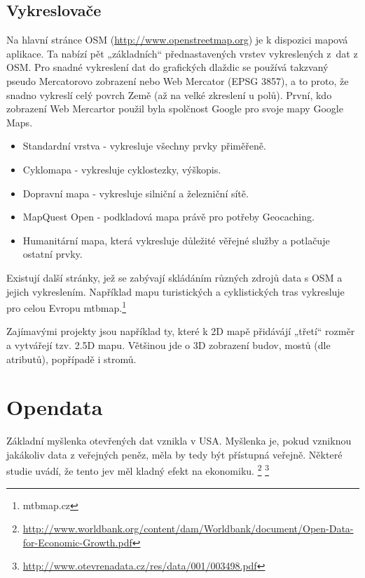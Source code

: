 \subsection{Vykreslovače}
\label{Vykreslovače}
Na hlavní stránce OSM (\url{http://www.openstreetmap.org}) je k dispozici mapová aplikace. Ta nabízí pět
„základních“ přednastavených vrstev vykreslených z~dat z OSM.
Pro snadné vykreslení dat do grafických dlaždic se používá takzvaný pseudo Mercatorovo
zobrazení nebo Web Mercator (EPSG 3857), a to proto, že snadno vykreslí celý povrch Země (až na velké zkreslení u polů). 
První, kdo zobrazení Web Mercartor použil byla spolčnost Google pro svoje mapy Google Maps.\cite{WebMercator}

\begin{itemize}
  \item Standardní vrstva - vykresluje všechny prvky přiměřeně.
  \item Cyklomapa - vykresluje cyklostezky, výškopis. 
  \item Dopravní mapa - vykresluje silniční a železniční sítě.
  \item MapQuest Open - podkladová mapa právě pro potřeby Geocaching.
  \item Humanitární mapa, která vykresluje důležité věřejné služby a potlačuje ostatní prvky. 
\end{itemize}

Existují další stránky, jež se zabývají skládáním různých zdrojů data s OSM a jejich vykreslením.
Například mapu turistických a cyklistických tras vykresluje
pro celou Evropu mtbmap.\footnote{mtbmap.cz}

Zajímavými projekty jsou například ty, které k 2D mapě přidávájí „třetí“ rozměr a
vytvářejí tzv. 2.5D mapu. Většinou jde o 3D zobrazení budov, mostů (dle
atributů), popřípadě i stromů.



\section{Opendata}
\label{opendata}

Základní myšlenka otevřených dat vznikla v USA.
Myšlenka je, pokud vzniknou jakákoliv data z veřejných peněz, měla by tedy být
přístupná veřejně. Některé studie uvádí, že tento jev měl kladný efekt na ekonomiku.
\footnote{\url{http://www.worldbank.org/content/dam/Worldbank/document/Open-Data-for-Economic-Growth.pdf}}
\footnote{\url{http://www.otevrenadata.cz/res/data/001/003498.pdf}}

